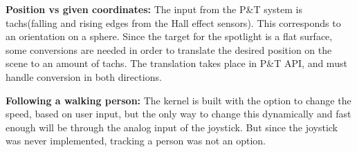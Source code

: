 \textbf{Position vs given coordinates:} The input from the P\&T system is tachs(falling and rising edges from the Hall effect sensors). This corresponds to an orientation on a sphere. Since the target for the spotlight is a flat surface, some conversions are needed in order to translate the desired position on the scene to an amount of tachs. The translation takes place in P\&T API, and must handle conversion in both directions.
 
 
\textbf{Following a walking person:} The kernel is built with the option to change the speed, based on user input, but the only way to change this dynamically and fast enough will be through the analog input of the joystick. But since the joystick was never implemented, tracking a person was not an option.
 




